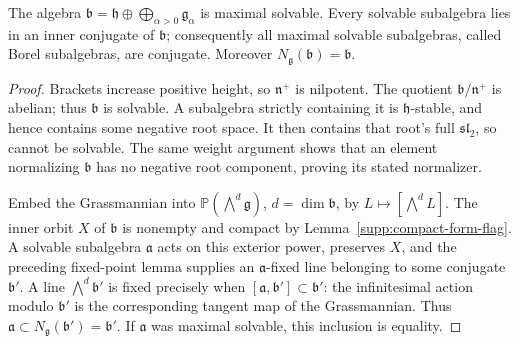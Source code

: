 \begin{theorem}\label{res:F06}
The algebra \(\mathfrak b=\mathfrak h\oplus
\bigoplus_{\alpha>0}\mathfrak g_\alpha\) is maximal solvable.
Every solvable subalgebra lies in an inner conjugate of
\(\mathfrak b\); consequently all maximal solvable
subalgebras, called Borel subalgebras, are conjugate.
Moreover \(N_{\mathfrak g}(\mathfrak b)=\mathfrak b\).
\end{theorem}
\begin{proof}
Brackets increase positive height, so \(\mathfrak n^+\)
is nilpotent. The quotient \(\mathfrak b/\mathfrak n^+\)
is abelian; thus \(\mathfrak b\) is solvable.
A subalgebra strictly containing it is \(\mathfrak h\)-stable,
and hence contains some negative root space.
It then contains that root's full \(\mathfrak{sl}_2\),
so cannot be solvable. The same weight argument shows that
an element normalizing \(\mathfrak b\) has no negative
root component, proving its stated normalizer.

Embed the Grassmannian into
\(\mathbb P(\bigwedge^d\mathfrak g)\), \(d=\dim\mathfrak b\),
by \(L\mapsto[\bigwedge^d L]\).
The inner orbit \(X\) of \(\mathfrak b\) is nonempty and
compact by Lemma~\ref{supp:compact-form-flag}.
A solvable subalgebra \(\mathfrak a\) acts on this
exterior power, preserves \(X\), and the preceding fixed-point
lemma supplies an \(\mathfrak a\)-fixed line belonging to
some conjugate \(\mathfrak b'\).
A line \(\bigwedge^d\mathfrak b'\) is fixed precisely when
\([\mathfrak a,\mathfrak b']\subset\mathfrak b'\):
the infinitesimal action modulo \(\mathfrak b'\) is
the corresponding tangent map of the Grassmannian.
Thus \(\mathfrak a\subset N_{\mathfrak g}(\mathfrak b')
=\mathfrak b'\). If \(\mathfrak a\) was maximal solvable,
this inclusion is equality.
\end{proof}

